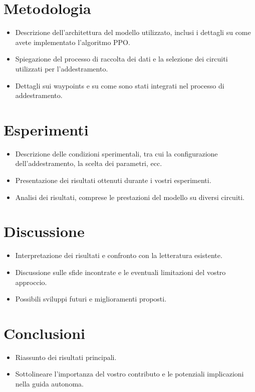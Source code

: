 \documentclass[conference]{IEEEtran}
\begin{document}
\section{Metodologia}

\begin{itemize}
    \item Descrizione dell'architettura del modello utilizzato, inclusi i dettagli su come avete implementato l'algoritmo PPO.

    \item Spiegazione del processo di raccolta dei dati e la selezione dei circuiti utilizzati per l'addestramento.

    \item Dettagli sui waypoints e su come sono stati integrati nel processo di addestramento.

\end{itemize}

\section{Esperimenti}

\begin{itemize}
    \item Descrizione delle condizioni sperimentali, tra cui la configurazione dell'addestramento, la scelta dei parametri, ecc.

    \item Presentazione dei risultati ottenuti durante i vostri esperimenti.

    \item Analisi dei risultati, comprese le prestazioni del modello su diversi circuiti.

\end{itemize}

\section{Discussione}

\begin{itemize}
    \item Interpretazione dei risultati e confronto con la letteratura esistente.

    \item Discussione sulle sfide incontrate e le eventuali limitazioni del vostro approccio.

    \item Possibili sviluppi futuri e miglioramenti proposti.

\end{itemize}

\section{Conclusioni}

\begin{itemize}
    \item Riassunto dei risultati principali.

    \item Sottolineare l'importanza del vostro contributo e le potenziali implicazioni nella guida autonoma.

\end{itemize}




\end{document}
